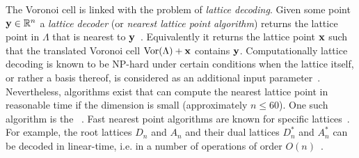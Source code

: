 \documentclass[draftcls, onecolumn, 11pt]{IEEEtran}
\begin{document}
The Voronoi cell is linked with the problem of \emph{lattice decoding}.  Given some point $\mathbf{y} \in {\mathbb R}^n$ a \emph{lattice decoder} (or \emph{nearest lattice point algorithm}) returns the lattice point in $\Lambda$ that is nearest to $\mathbf{y}$~\cite{Agrell2002}.  Equivalently it returns the lattice point $\mathbf{x}$ such that the translated Voronoi cell $\operatorname{Vor}(\Lambda) + \mathbf{x}$ contains $\mathbf{y}$.  Computationally lattice decoding is known to be NP-hard under certain conditions when the lattice itself, or rather a basis thereof, is considered as an additional input parameter~\cite{micciancio_hardness_2001, Jalden2005_sphere_decoding_complexity}. Nevertheless, algorithms exist that can compute the nearest lattice point in reasonable time if the dimension is small (approximately $n \leq 60$). One such algorithm is the ~\cite{Viterbo_sphere_decoder_1999,Pohst_sphere_decoder_1981,Agrell2002}.   %
Fast nearest point algorithms are known for specific lattices~\citep{Conway1982FastQuantDec, McKilliam2008, McKilliam2009CoxeterLattices,Vardy1993_leech_lattice_MLD}. For example, the root lattices $D_n$ and $A_n$ and their dual lattices $D_n^*$ and $A_n^*$ can be decoded in linear-time, i.e. in a number of operations of order $O(n)$~\cite{Conway1982FastQuantDec,McKilliam2009CoxeterLattices}.

\end{document}

